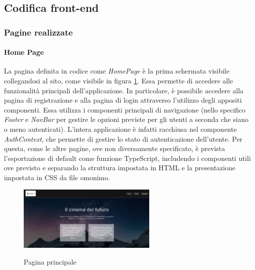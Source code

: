 \newpage
\subsection{Codifica front-end}

\subsubsection{Pagine realizzate}

\paragraph{Home Page}

La pagina definita in codice come \textit{HomePage} è la prima schermata visibile collegandosi al sito, come visibile in figura \ref{fig:pagina-principale}. Essa permette di accedere alle funzionalità principali dell'applicazione.
In particolare, è possibile accedere alla pagina di registrazione e alla pagina di login attraverso l'utilizzo degli appositi componenti.
Essa utilizza i componenti principali di navigazione (nello specifico \textit{Footer} e \textit{NavBar} per gestire le opzioni 
previste per gli utenti a seconda che siano o meno autenticati). L'intera applicazione è infatti racchiusa nel componente \textit{AuthContext}, che permette di gestire lo stato di autenticazione dell'utente.
Per questa, come le altre pagine, ove non diversamente specificato, è prevista l'esportazione di default come funzione TypeScript, includendo i componenti utili ove previsto e 
separando la struttura impostata in HTML e la presentazione impostata in CSS da file omonimo.

\begin{figure}[h]
    \centering
    \includegraphics[width=0.6\textwidth, alt={Pagina principale dell'applicazione}]{immagini/frontend/home.png}
    \caption{Pagina principale}\label{fig:pagina-principale}
\end{figure}


